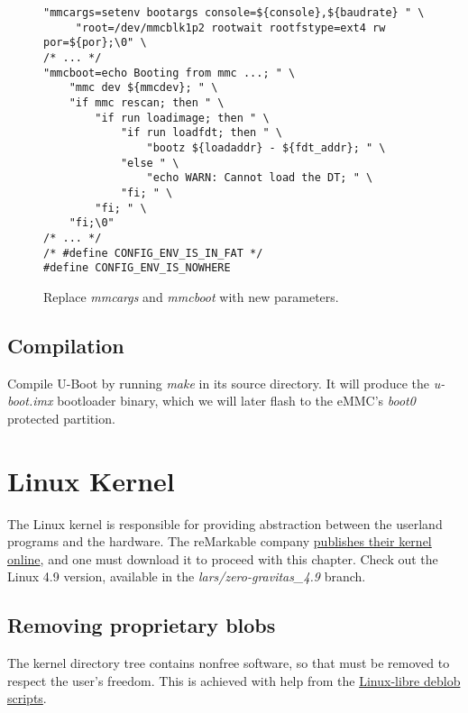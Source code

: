 \documentclass{memoir}
\begin{document}
\begin{figure}[h]
\begin{verbatim}
"mmcargs=setenv bootargs console=${console},${baudrate} " \
     "root=/dev/mmcblk1p2 rootwait rootfstype=ext4 rw por=${por};\0" \
/* ... */
"mmcboot=echo Booting from mmc ...; " \
    "mmc dev ${mmcdev}; " \
    "if mmc rescan; then " \
        "if run loadimage; then " \
            "if run loadfdt; then " \
                "bootz ${loadaddr} - ${fdt_addr}; " \
            "else " \
                "echo WARN: Cannot load the DT; " \
            "fi; " \
        "fi; " \
    "fi;\0"
/* ... */
/* #define CONFIG_ENV_IS_IN_FAT */
#define CONFIG_ENV_IS_NOWHERE
\end{verbatim}
\caption{Replace \textit{mmcargs} and \textit{mmcboot} with new parameters.}
\label{fig:mmcargs}
\end{figure}




\section{Compilation}
Compile U-Boot by running \textit{make} in its source directory. It will produce the \textit{u-boot.imx} bootloader binary, which we will later flash to the eMMC's \textit{boot0} protected partition.




\chapter{Linux Kernel}
\label{ch:linux}
The Linux kernel is responsible for providing abstraction between the userland programs and the hardware. The reMarkable company \href{https://github.com/remarkable/linux}{publishes their kernel online}, and one must download it to proceed with this chapter. Check out the Linux 4.9 version, available in the \textit{lars/zero-gravitas\_4.9} branch.

\section{Removing proprietary blobs}
The kernel directory tree contains nonfree software, so that must be removed to respect the user's freedom. This is achieved with help from the \href{https://linux-libre.fsfla.org/pub/linux-libre/releases/}{Linux-libre deblob scripts}.
\end{document}
